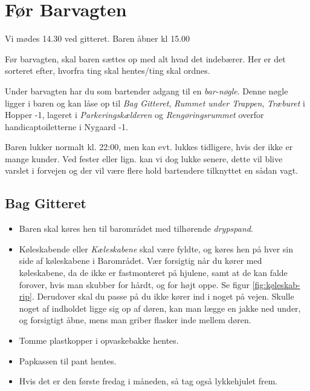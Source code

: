 \section{Før Barvagten}
\label{sec:pre-barvagten}

Vi mødes 14.30 ved gitteret. Baren åbner kl 15.00

Før barvagten, skal baren sættes op med alt hvad det indebærer. Her er
det sorteret efter, hvorfra ting skal hentes/ting skal ordnes.

Under barvagten har du som bartender adgang til en \textit{bar-nøgle}. 
Denne nøgle ligger i baren og kan låse op til \textit{Bag Gitteret}, 
\textit{Rummet under Trappen}, \textit{Træburet} i Hopper -1, 
lageret i \textit{Parkeringskælderen} og 
\textit{Rengøringsrummet} overfor handicaptoiletterne i Nygaard -1.

Baren lukker normalt kl. 22:00, men kan evt. lukkes tidligere, hvis der ikke er mange kunder.
Ved fester eller lign. kan vi dog lukke senere, dette vil blive varslet i forvejen og der vil 
være flere hold bartendere tilknyttet en sådan vagt.

\subsection{Bag Gitteret}
\label{sec:pre:bag-ved-gitteret}

\begin{itemize}
	\item Baren skal køres hen til barområdet med tilhørende \textit{drypspand}.
	\item Køleskabende eller \textit{Kæleskabene} skal være fyldte, og køres hen på hver sin side af køleskabene i 
	Barområdet. Vær forsigtig når du kører med køleskabene, da de ikke er fastmonteret på hjulene, 
	samt at de kan falde forover, hvis man skubber for hårdt, og for højt oppe. Se figur \ref{fig:køleskab-rip}. Derudover skal
	du passe på du ikke kører ind i noget på vejen. Skulle noget af indholdet ligge sig op af døren, kan man lægge en jakke
	ned under, og forsigtigt åbne, mens man griber flasker inde mellem døren.
	\item Tomme plastkopper i opvaskebakke hentes.
	\item Papkassen til pant hentes.
	\item Hvis det er den første fredag i måneden, så tag også lykkehjulet frem.
\end{itemize}

